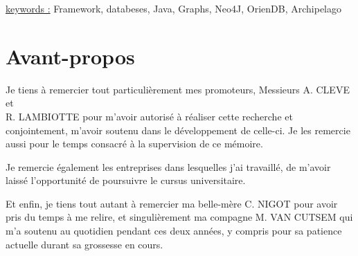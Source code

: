 \documentclass[a4paper,fleqn,12pt,oneside]{report}
\begin{document}
\quad \quad \underline{keywords :} Framework, databeses, Java, Graphs, Neo4J, OrienDB, Archipelago

\chapter*{Avant-propos}

Je tiens à remercier tout particulièrement mes promoteurs, Messieurs A. CLEVE et \\R. LAMBIOTTE pour m'avoir autorisé à réaliser cette recherche et conjointement, m'avoir soutenu dans le développement de celle-ci. Je les remercie aussi pour le temps consacré à la supervision de ce mémoire. 

Je remercie également les entreprises dans lesquelles j'ai travaillé, de m'avoir laissé l'opportunité de poursuivre le cursus universitaire.

Et enfin, je tiens tout autant à remercier ma belle-mère C. NIGOT pour avoir pris du temps à me relire, et singulièrement ma compagne M. VAN CUTSEM qui m'a soutenu au quotidien pendant ces deux années, y compris pour sa patience actuelle durant sa grossesse en cours.


\tableofcontents
\newpage
\end{document}

